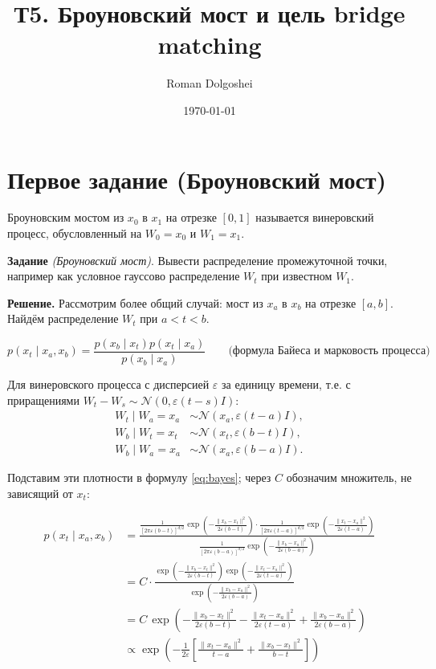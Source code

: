 \documentclass[a4paper, 12pt]{article}
\title{Т5. Броуновский мост и цель bridge matching}
\author{Roman Dolgoshei}
\date{\today}
\begin{document}
\maketitle
\tableofcontents
\newpage

\section{Первое задание (Броуновский мост)}

\begin{definition}
  Броуновским мостом из $x_0$ в $x_1$ на отрезке $[0, 1]$ называется винеровский процесс, обусловленный на $W_0 = x_0$ и $W_1 = x_1$.
\end{definition}

\textbf{Задание} \textit{(Броуновский мост)}. Вывести распределение промежуточной точки, например как условное гауссово распределение $W_t$ при известном $W_1$.

\textbf{Решение.} Рассмотрим более общий случай: мост из $x_a$ в $x_b$ на отрезке $[a,b]$. Найдём распределение $W_t$ при $a < t < b$.

\begin{equation}\label{eq:bayes}
  p(x_t \mid x_a, x_b) = \frac{p(x_b \mid x_t) p(x_t \mid x_a)}{p(x_b \mid x_a)} \qquad \text{(формула Байеса и марковость процесса)}
\end{equation}

Для винеровского процесса с дисперсией $\varepsilon$ за единицу времени, т.е. с приращениями $W_t - W_s \sim \mathcal N(0, \varepsilon (t - s) I)$:
\[
\begin{aligned}
W_t\mid W_a=x_a
&\sim \mathcal N(x_a,\varepsilon(t-a)I),\\
W_b\mid W_t=x_t
&\sim \mathcal N(x_t,\varepsilon(b-t)I),\\
W_b\mid W_a=x_a
&\sim \mathcal N(x_a,\varepsilon(b-a)I).
\end{aligned}
\]

Подставим эти плотности в формулу \eqref{eq:bayes}; через $C$ обозначим множитель, не зависящий от $x_t$:

\[
\begin{aligned}
p(x_t \mid x_a, x_b)
&= \frac{
\frac{1}{[2\pi\varepsilon(b-t)]^{d/2}}
\exp\left(-\frac{\|x_b-x_t\|^2}{2\varepsilon(b-t)}\right)
\cdot
\frac{1}{[2\pi\varepsilon(t-a)]^{d/2}}
\exp\left(-\frac{\|x_t-x_a\|^2}{2\varepsilon(t-a)}\right)
}{
\frac{1}{[2\pi\varepsilon(b-a)]^{d/2}}
\exp\left(-\frac{\|x_b-x_a\|^2}{2\varepsilon(b-a)}\right)
} \\
&= C \cdot
\frac{
\exp\left(-\frac{\|x_b-x_t\|^2}{2\varepsilon(b-t)}\right)
\exp\left(-\frac{\|x_t-x_a\|^2}{2\varepsilon(t-a)}\right)
}{
\exp\left(-\frac{\|x_b-x_a\|^2}{2\varepsilon(b-a)}\right)
} \\
&= C \,\exp\left(-\frac{\|x_b-x_t\|^2}{2\varepsilon(b-t)}-\frac{\|x_t-x_a\|^2}{2\varepsilon(t-a)}+\frac{\|x_b-x_a\|^2}{2\varepsilon(b-a)}\right) \\ &\propto \exp\left( -\frac{1}{2\varepsilon} \left[ \frac{\|x_t - x_a\|^2}{t - a} + \frac{\|x_b - x_t\|^2}{b - t} \right]\right)
\end{aligned}
\] 
\end{document}
